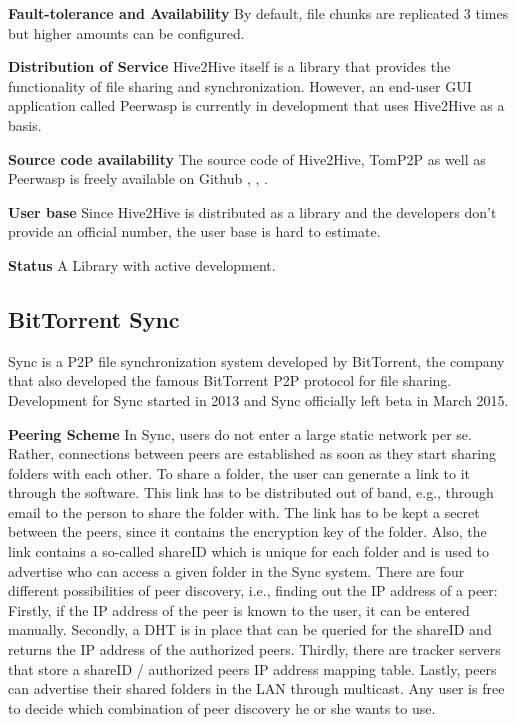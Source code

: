 \textbf{Fault-tolerance and Availability}
By default, file chunks are replicated 3 times but higher amounts can be configured.

\textbf{Distribution of Service}
Hive2Hive itself is a library that provides the functionality of file sharing and synchronization. However, an end-user GUI application called Peerwasp \cite{peerwasp} is currently in development that uses Hive2Hive as a basis.

\textbf{Source code availability}
The source code of Hive2Hive, TomP2P as well as Peerwasp is freely available on Github \cite{hive2hive:github}, \cite{tomp2p:github}, \cite{peerwasp:github}. 

\textbf{User base}
Since Hive2Hive is distributed as a library and the developers don't provide an official number, the user base is hard to estimate.

\textbf{Status}
A Library with active development.

\subsection{BitTorrent Sync}
\label{subsec:bittorrent}
Sync is a P2P file synchronization system developed by BitTorrent, the company that also developed the famous BitTorrent P2P protocol for file sharing. Development for Sync started in 2013 and Sync officially left beta in March 2015.

\textbf{Peering Scheme}
In Sync, users do not enter a large static network per se. Rather, connections between peers are established as soon as they start sharing folders with each other. To share a folder, the user can generate a link to it through the software. This link has to be distributed out of band, e.g., through email to the person to share the folder with. The link has to be kept a secret between the peers, since it contains the encryption key of the folder. Also, the link contains a so-called shareID which is unique for each folder and is used to advertise who can access a given folder in the Sync system. There are four different possibilities of peer discovery, i.e., finding out the IP address of a peer: Firstly, if the IP address of the peer is known to the user, it can be entered manually. Secondly, a DHT is in place that can be queried for the shareID and returns the IP address of the authorized peers. Thirdly, there are tracker servers that store a shareID / authorized peers IP address mapping table. Lastly, peers can advertise their shared folders in the LAN through multicast. Any user is free to decide which combination of peer discovery he or she wants to use.

